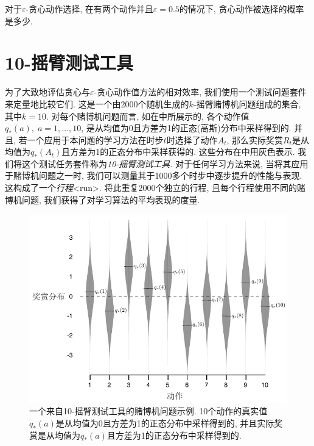 \begin{exer}
对于$\varepsilon$-贪心动作选择, 在有两个动作并且$\varepsilon = 0.5$的情况下, 贪心动作被选择的概率是多少.
\end{exer}

\section{10-摇臂测试工具}\label{sec:2.3}

为了大致地评估贪心与$\varepsilon​$-贪心动作值方法的相对效率, 我们使用一个测试问题套件来定量地比较它们. 这是一个由2000个随机生成的$k​$-摇臂赌博机问题组成的集合, 其中$k = 10​$. 对每个赌博机问题而言, 如在中所展示的, 各个动作值$q_*(a), \; a= 1, \dots, 10​$, 是从均值为0且方差为1的正态(高斯)分布中采样得到的. 并且, 若一个应用于本问题的学习方法在时步$t​$时选择了动作$A_t​$, 那么实际奖赏$R_t​$是从均值为$q_*(A_t)​$且方差为1的正态分布中采样获得的. 这些分布在中用灰色表示. 我们将这个测试任务套件称为\emph{10-摇臂测试工具}. 对于任何学习方法来说, 当将其应用于赌博机问题之一时, 我们可以测量其于1000多个时步中逐步提升的性能与表现. 这构成了一个\emph{行程}<run>. 将此重复2000个独立的行程, 且每个行程使用不同的赌博机问题, 我们获得了对学习算法的平均表现的度量.

\begin{figure}[ht]
\centering
\includegraphics[width=.8\textwidth]{c2/img/figure2-1.pdf}
\caption{一个来自10-摇臂测试工具的赌博机问题示例. 10个动作的真实值$q_*(a)$是从均值为0且方差为1的正态分布中采样得到的, 并且实际奖赏是从均值为$q_*(a)$且方差为1的正态分布中采样得到的.}\label{fig:2.1}
\end{figure}

